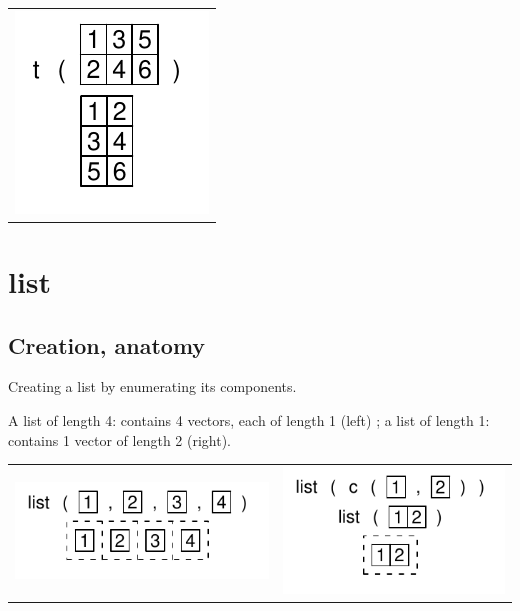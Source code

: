 \documentclass[pdflatex]{article}
\begin{document}
\begin{tabular}{c}
\includegraphics{t.pdf}\\
\end{tabular}


\section{list}

\subsection{Creation, anatomy}

Creating a list by enumerating its components.

A list of length 4: contains 4 vectors, each of length 1 (left) ;
a list of length 1: contains 1 vector of length 2 (right).

\begin{tabular}{cc}
\includegraphics{list_enumerate.pdf} & \includegraphics{list_onetype.pdf}
\end{tabular}

% 
\end{document}
